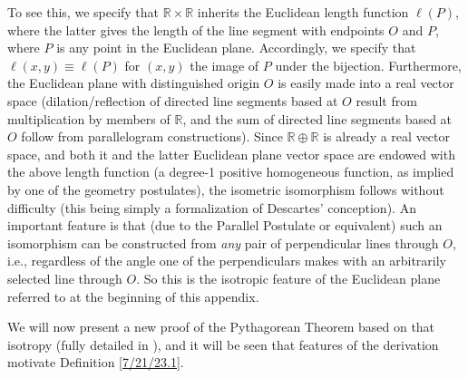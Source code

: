 \documentclass{amsart}
\numberwithin{equation}{section}
\theoremstyle{definition}
\numberwithin{theorem}{section}
\begin{document}
To see this, we specify that $\mathbb{R}\times\mathbb{R}$  inherits the Euclidean length function $\ell(P)$, where the latter gives the length of the line segment with endpoints $O$ and $P$, where $P$ is  any point in the Euclidean plane.  Accordingly, we specify that $\ell(x,y) \equiv \ell(P)$ for $(x,y)$ the image of $P$ under the bijection.  Furthermore, the Euclidean plane with distinguished origin $O$ is easily made into a real vector space (dilation/reflection of directed line segments based at $O$ result from multiplication by members of $\mathbb{R}$, and the sum of directed line segments based at $O$ follow from parallelogram constructions).   Since $\mathbb{R}\oplus\mathbb{R}$ is already a real vector space, and both it and the latter Euclidean plane vector space are endowed with the above length function (a degree-1 positive homogeneous function, as implied by one of the geometry postulates), the isometric isomorphism follows without difficulty (this being simply a formalization of Descartes' conception).  An important feature is that (due to the Parallel Postulate or equivalent) such an isomorphism can be constructed from {\it any} pair of perpendicular lines through $O$, i.e., regardless of the angle one of the perpendiculars makes with an arbitrarily selected line through $O$.  So this is the isotropic feature of the Euclidean plane referred to at the beginning of this appendix.    
 
 We will now present a new proof of the Pythagorean Theorem based on that isotropy (fully detailed in \cite{fgreensite:2022b}), and it will be seen that features of the derivation motivate Definition \ref{7/21/23.1}.
 
\end{document}
